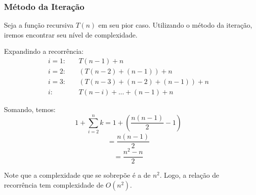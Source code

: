 \subsubsection{Método da Iteração}
Seja a função recursiva $T(n)$ em seu pior caso. Utilizando o método da iteração, iremos encontrar seu nível de complexidade. 

Expandindo a recorrência: 
\begin{align*}
i = 1: & \quad T(n - 1) + n \\
i = 2: & \quad (T(n - 2) + (n - 1)) + n \\
i = 3: & \quad (T(n - 3) + (n - 2) + (n - 1)) + n \\
i: & \quad T(n - i) + ... + (n - 1) + n
\end{align*}

Somando, temos:
\[
1 + \sum_{i=2}^{n} k = 1 + \left( \frac{n(n-1)}{2} - 1 \right)
\]
\[
= \frac{n(n-1)}{2}
\]
\[
= \frac{n^2 - n}{2}
\]

Note que a complexidade que se sobrepõe é a de \( n^2 \). Logo, a relação de recorrência tem complexidade de \( O(n^2) \).
